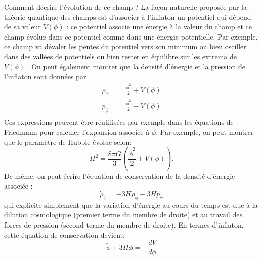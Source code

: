 Comment décrire l'évolution de ce champ ? La façon naturelle proposée par la théorie quantique des champs est d'associer à l'inflaton un potentiel qui dépend de sa valeur $V(\phi)$  : ce potentiel associe une énergie à la valeur du champ et ce champ évolue dans ce potentiel comme dans une énergie potentielle. Par exemple, ce champ va dévaler les pentes du potentiel vers son minimum ou bien osciller dans des vallées de potentiels ou bien rester en équilibre sur les extrema de $V(\phi)$ . On peut également montrer que la densité d'énergie et la pression de l'inflaton sont données par  
\begin{eqnarray}
\rho_\phi&=&\frac{\dot \phi^2}{2}+V(\phi)\\
p_\phi&=&\frac{\dot \phi^2}{2}-V(\phi)\\
\end{eqnarray}
Ces expressions peuvent être réutilisées par exemple dans les équations de Friedmann pour calculer l'expansion associée à $\phi$. Par exemple, on peut montrer que le paramètre de Hubble évolue selon:
\begin{equation}
H^2=\frac{8\pi G}{3}\left(\frac{\dot \phi^2}{2}+V(\phi)\right).
\label{e:hubbleinf}
\end{equation}
De même, on peut écrire l'équation de conservation de la densité d'énergie associée :
\begin{equation}
\dot \rho_\phi= -3H\rho_\phi-3Hp_\phi
\end{equation}
qui explicite simplement que la variation d'énergie au cours du temps est due à la dilution cosmologique (premier terme du membre de droite) et au travail des forces de pression (second terme du membre de droite). En termes d'inflaton, cette équation de conservation devient:
\begin{equation}
\ddot \phi+ 3H \dot \phi = -\frac{d V}{d\phi}
\end{equation}

